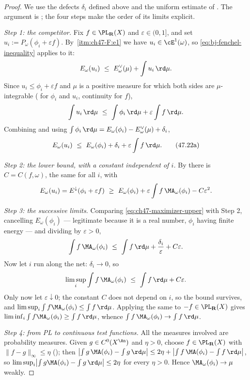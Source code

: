 \begin{proof}
We use the defects $\delta_i$ defined above and the uniform estimate
of . The argument is
\cite[Theorem~9.11]{BJ22}; the four steps make the order of its
limits explicit.

\emph{Step 1: the competitor.}  Fix $f\in\PL_{\mathbf R}(X)$ and
$\varepsilon\in(0,1]$, and set $u_i:=P_\omega(\phi_i+\varepsilon f)$.
By \,\cref{itm:ch47-F:e1} we have
$u_i\in\cE^1(\omega)$, so \eqref{eq:bj-fenchel-inequality} applies to it:
\[
 E_\omega(u_i)\ \le\ E^\vee_\omega(\mu)+\int u_i\,\rd\mu .
\]
Since $u_i\le\phi_i+\varepsilon f$ and $\mu$ is a positive measure for
which both sides are $\mu$-integrable
( for $\phi_i$ and $u_i$, continuity for
$f$),
\[
 \int u_i\,\rd\mu\ \le\ \int\phi_i\,\rd\mu+\varepsilon\int f\,\rd\mu .
\]
Combining and using
$\int\phi_i\,\rd\mu=E_\omega(\phi_i)-E^\vee_\omega(\mu)+\delta_i$,
\[
 E_\omega(u_i)\ \le\ E_\omega(\phi_i)+\delta_i
 +\varepsilon\int f\,\rd\mu .
\tag{47.22a}\label{eq:ch47-maximizer-upper}
\]

\emph{Step 2: the lower bound, with a constant independent of $i$.}  By
 there is $C=C(f,\omega)$, the same for all
$i$, with
\[
 E_\omega(u_i)=E^\downarrow(\phi_i+\varepsilon f)
 \ \ge\ E_\omega(\phi_i)+\varepsilon\int f\,\MA_\omega(\phi_i)
 -C\varepsilon^2 .
\]

\emph{Step 3: the successive limits.}  Comparing
\eqref{eq:ch47-maximizer-upper} with Step 2, cancelling
$E_\omega(\phi_i)$ --- legitimate because it is a real number, $\phi_i$
having finite energy --- and dividing by $\varepsilon>0$,
\[
 \int f\,\MA_\omega(\phi_i)\ \le\ \int f\,\rd\mu
 +\frac{\delta_i}{\varepsilon}+C\varepsilon .
\]
Now let $i$ run along the net: $\delta_i\to0$, so
\[
 \limsup_i\int f\,\MA_\omega(\phi_i)\ \le\ \int f\,\rd\mu+C\varepsilon .
\]
Only now let $\varepsilon\downarrow0$; the constant $C$ does not
depend on $i$, so the bound survives, and
$\limsup_i\int f\MA_\omega(\phi_i)\le\int f\,\rd\mu$.  Applying the same
to $-f\in\PL_{\mathbf R}(X)$ gives
$\liminf_i\int f\MA_\omega(\phi_i)\ge\int f\,\rd\mu$, whence
$\int f\,\MA_\omega(\phi_i)\to\int f\,\rd\mu$.

\emph{Step 4: from PL to continuous test functions.}  All the measures
involved are probability measures.  Given $g\in C^0(X^{\An})$ and
$\eta>0$, choose $f\in\PL_{\mathbf R}(X)$ with
$\lVert f-g\rVert_\infty\le\eta$ (); then
$\bigl|\int g\,\MA(\phi_i)-\int g\,\rd\mu\bigr|
\le2\eta+\bigl|\int f\,\MA(\phi_i)-\int f\,\rd\mu\bigr|$,
so $\limsup_i\bigl|\int g\MA(\phi_i)-\int g\,\rd\mu\bigr|\le2\eta$ for
every $\eta>0$.  Hence $\MA_\omega(\phi_i)\to\mu$ weakly.
\end{proof}

